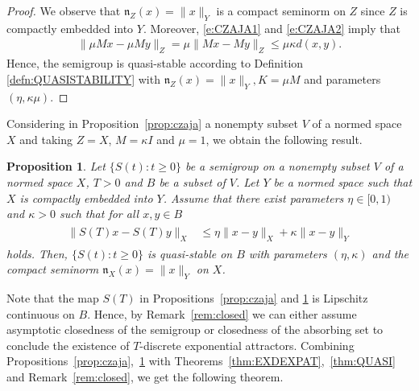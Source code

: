\documentclass[a4paper,12pt,reqno]{amsart}
\theoremstyle{plain}
\newtheorem{prop}[lem]{Proposition}
\theoremstyle{definition}
\numberwithin{equation}{section}
\renewcommand{\geq}{\geqslant}
\renewcommand{\leq}{\leqslant}
\begin{document}
\begin{proof}
We observe that 
$\mathfrak{n}_{Z}(x)=\|x\|_Y$ is a compact seminorm on $Z$ since $Z$ is compactly embedded into $Y$. 
Moreover, \eqref{e:CZAJA1} and \eqref{e:CZAJA2} imply that 
\begin{align*}
\|\mu Mx-\mu My\|_Z=\mu \|Mx-My\|_Z\leq \mu\kappa d(x,y).
\end{align*}
Hence, the semigroup is quasi-stable according to Definition \ref{defn:QUASISTABILITY} with $\mathfrak{n}_{Z}(x)=\|x\|_Y, K=\mu M$ and parameters $(\eta,\kappa\mu)$. 
\end{proof}

Considering in Proposition~\ref{prop:czaja} a nonempty subset $V$ of a normed space $X$ and taking $Z=X$, $M=\kappa I$ and $\mu=1$, we obtain the following result.

\begin{prop}\label{prop:czaja_mod}
Let $\{S(t)\colon t\geq 0\}$ be a semigroup on a nonempty subset $V$ of a normed space $X$, $T>0$ and $B$ be a subset of $V$. 
Let $Y$ be a normed space such that $X$ is compactly embedded into $Y$. Assume that there exist parameters $\eta\in[0,1)$ and $\kappa>0$ such that for all $x,y\in B$ 
\begin{align*}
\begin{split}
\|S(T)x-S(T)y\|_X&\leq \eta\|x-y\|_X+\kappa\|x-y\|_Y
\end{split}
\end{align*}
holds. Then, $\{S(t)\colon t\geq 0\}$ is quasi-stable on $B$ with parameters $(\eta,\kappa)$  and the compact seminorm $\mathfrak{n}_{X}(x)=\|x\|_Y$ on $X$.
\end{prop}

Note that the map $S(T)$ in Propositions~\ref{prop:czaja} and \ref{prop:czaja_mod} is Lipschitz continuous on $B$. Hence, by Remark~\ref{rem:closed} we can either assume asymptotic closedness of the semigroup or closedness of the absorbing set to conclude the existence of $T$-discrete  exponential attractors.
Combining Propositions~\ref{prop:czaja},~\ref{prop:czaja_mod} with Theorems~\ref{thm:EXDEXPAT},~\ref{thm:QUASI} and Remark~\ref{rem:closed}, we get the following theorem.
\end{document}
